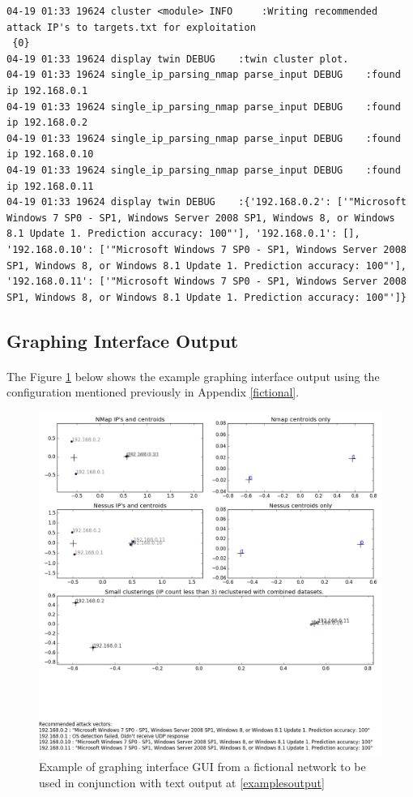 \begin{lstlisting}[style=lineoutput]
04-19 01:33 19624 cluster <module> INFO     :Writing recommended attack IP's to targets.txt for exploitation
 {0}
04-19 01:33 19624 display twin DEBUG    :twin cluster plot.
04-19 01:33 19624 single_ip_parsing_nmap parse_input DEBUG    :found ip 192.168.0.1
04-19 01:33 19624 single_ip_parsing_nmap parse_input DEBUG    :found ip 192.168.0.2
04-19 01:33 19624 single_ip_parsing_nmap parse_input DEBUG    :found ip 192.168.0.10
04-19 01:33 19624 single_ip_parsing_nmap parse_input DEBUG    :found ip 192.168.0.11
04-19 01:33 19624 display twin DEBUG    :{'192.168.0.2': ['"Microsoft Windows 7 SP0 - SP1, Windows Server 2008 SP1, Windows 8, or Windows 8.1 Update 1. Prediction accuracy: 100"'], '192.168.0.1': [], '192.168.0.10': ['"Microsoft Windows 7 SP0 - SP1, Windows Server 2008 SP1, Windows 8, or Windows 8.1 Update 1. Prediction accuracy: 100"'], '192.168.0.11': ['"Microsoft Windows 7 SP0 - SP1, Windows Server 2008 SP1, Windows 8, or Windows 8.1 Update 1. Prediction accuracy: 100"']}
\end{lstlisting}

\subsection{Graphing Interface Output}
\label{example_twin}

\paragraph{}The Figure \ref{example_twin} below shows the example graphing interface output using the configuration mentioned previously in Appendix \ref{fictional}.

\begin{figure}[!h]
\centering
\includegraphics[width=6in]{./Figures/example_twin.png}
\caption{Example of graphing interface GUI from a fictional network to be used in conjunction with text output at \ref{examplesoutput}}
\label{example_twin}
\end{figure}
